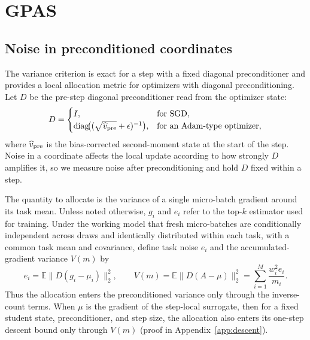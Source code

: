 \section{GPAS}
\label{sec:theory}

\subsection{Noise in preconditioned coordinates}

The variance criterion is exact for a step with a fixed diagonal
preconditioner and provides a local allocation metric for optimizers with
diagonal preconditioning. Let $D$ be the pre-step diagonal preconditioner read
from the optimizer state:
\[
    D=
    \begin{cases}
        I, & \text{for SGD},\\
        \operatorname{diag}\!\bigl((\sqrt{\widehat v_{\rm pre}}+\epsilon)^{-1}\bigr),
        & \text{for an Adam-type optimizer},
    \end{cases}
\]
where $\widehat v_{\rm pre}$ is the bias-corrected second-moment state at the
start of the step. Noise in a coordinate affects the local update according to
how strongly $D$ amplifies it, so we measure noise after preconditioning and
hold $D$ fixed within a step.

The quantity to allocate is the variance of a single micro-batch gradient
around its task mean. Unless noted otherwise, $g_i$ and $e_i$ refer to the
top-$k$ estimator used for training. Under the working model that fresh
micro-batches are conditionally independent across draws and identically
distributed within each task, with a common task mean and covariance, define
task noise $e_i$ and the accumulated-gradient variance $V(m)$ by
\begin{equation}
    e_i=\mathbb E\bigl\|D(g_i-\mu_i)\bigr\|_2^2,
    \qquad
    V(m)=\mathbb E\bigl\|D(A-\mu)\bigr\|_2^2
        =\sum_{i=1}^M\frac{w_i^2e_i}{m_i}.
    \label{eq:batch_variance}
\end{equation}
Thus the allocation enters the preconditioned variance only through the
inverse-count terms. When $\mu$ is the gradient of the step-local surrogate,
then for a fixed student state, preconditioner, and step size, the allocation
also enters its one-step descent bound only through $V(m)$ (proof in
Appendix~\ref{app:descent}).

